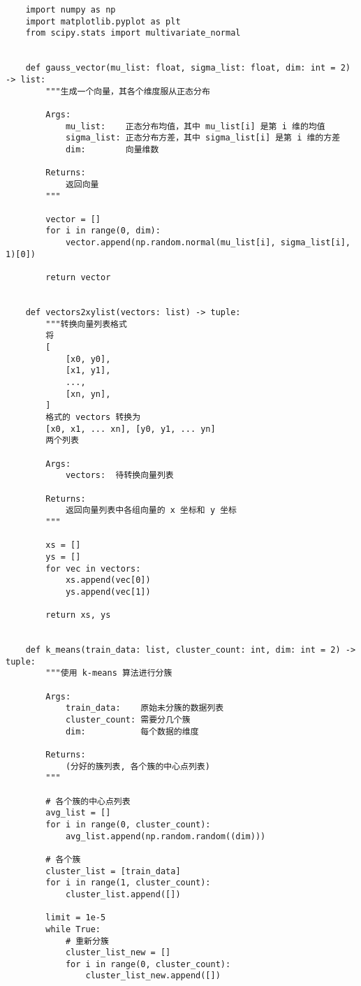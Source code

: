 \begin{verbatim}
    import numpy as np
    import matplotlib.pyplot as plt
    from scipy.stats import multivariate_normal


    def gauss_vector(mu_list: float, sigma_list: float, dim: int = 2) -> list:
        """生成一个向量，其各个维度服从正态分布

        Args:
            mu_list:    正态分布均值，其中 mu_list[i] 是第 i 维的均值
            sigma_list: 正态分布方差，其中 sigma_list[i] 是第 i 维的方差
            dim:        向量维数

        Returns:
            返回向量
        """

        vector = []
        for i in range(0, dim):
            vector.append(np.random.normal(mu_list[i], sigma_list[i], 1)[0])

        return vector


    def vectors2xylist(vectors: list) -> tuple:
        """转换向量列表格式
        将
        [
            [x0, y0],
            [x1, y1],
            ...,
            [xn, yn],
        ]
        格式的 vectors 转换为
        [x0, x1, ... xn], [y0, y1, ... yn]
        两个列表

        Args:
            vectors:  待转换向量列表

        Returns:
            返回向量列表中各组向量的 x 坐标和 y 坐标
        """

        xs = []
        ys = []
        for vec in vectors:
            xs.append(vec[0])
            ys.append(vec[1])

        return xs, ys


    def k_means(train_data: list, cluster_count: int, dim: int = 2) -> tuple:
        """使用 k-means 算法进行分簇

        Args:
            train_data:    原始未分簇的数据列表
            cluster_count: 需要分几个簇
            dim:           每个数据的维度

        Returns:
            (分好的簇列表, 各个簇的中心点列表)
        """

        # 各个簇的中心点列表
        avg_list = []
        for i in range(0, cluster_count):
            avg_list.append(np.random.random((dim)))

        # 各个簇
        cluster_list = [train_data]
        for i in range(1, cluster_count):
            cluster_list.append([])

        limit = 1e-5
        while True:
            # 重新分簇
            cluster_list_new = []
            for i in range(0, cluster_count):
                cluster_list_new.append([])


\end{verbatim}
